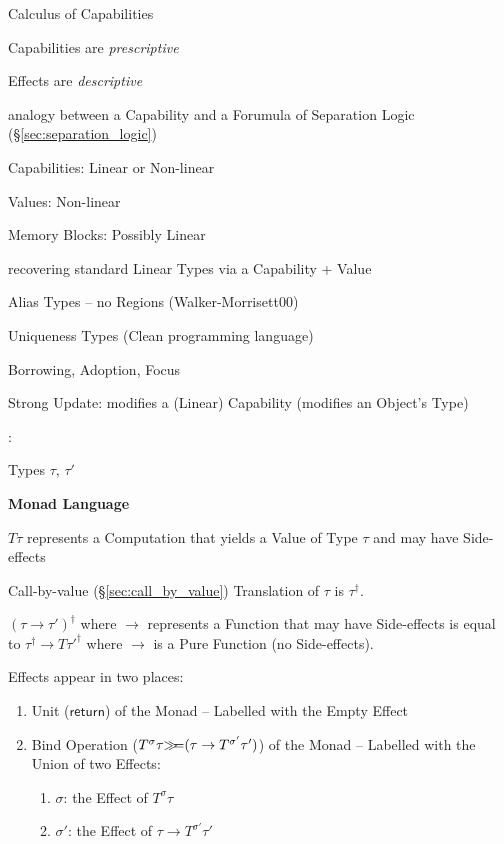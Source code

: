 Calculus of Capabilities

Capabilities are \emph{prescriptive}

Effects are \emph{descriptive}

analogy between a Capability and a Forumula of Separation Logic
(\S\ref{sec:separation_logic})

Capabilities: Linear or Non-linear

Values: Non-linear

Memory Blocks: Possibly Linear

recovering standard Linear Types via a Capability + Value

Alias Types -- no Regions (Walker-Morrisett00) %

Uniqueness Types (Clean programming language)

Borrowing, Adoption, Focus %

Strong Update: modifies a (Linear) Capability (modifies an Object's
Type)



\asterism


\cite{wadler-thiemann03}:

Types $\tau$, $\tau'$


\textbf{Monad Language}

$T \tau$ represents a Computation that yields a Value
of Type $\tau$ and may have Side-effects

Call-by-value (\S\ref{sec:call_by_value}) Translation of $\tau$ is
$\tau^\dag$.

$(\tau \rightarrow \tau')^\dag$ where $\rightarrow$ represents a
Function that may have Side-effects is equal to $\tau^\dag \rightarrow
T \tau'^\dag$ where $\rightarrow$ is a Pure Function (no Side-effects).

Effects appear in two places:
\begin{enumerate}
  \item Unit ($\mathsf{return}$) of the Monad -- Labelled with the
    Empty Effect
  \item Bind Operation ($T^\sigma\tau \mathsf{\gg\kern-3pt=} (\tau \rightarrow
    T^{\sigma'}\tau')$) of the Monad -- Labelled with the Union of two
    Effects: %
    \begin{enumerate}
      \item $\sigma$: the Effect of $T^\sigma\tau$
      \item $\sigma'$: the Effect of $\tau \rightarrow
        T^{\sigma'}\tau'$
    \end{enumerate}
\end{enumerate}

